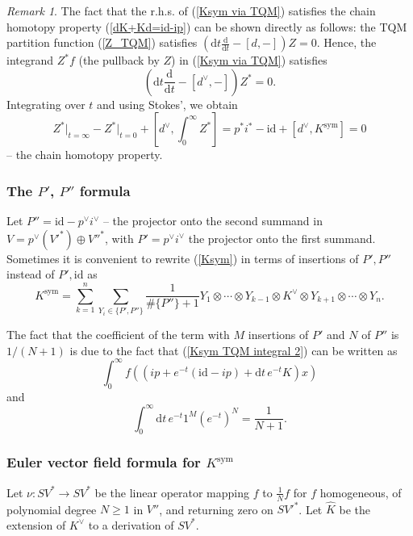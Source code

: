 \documentclass{amsart}
\theoremstyle{plain} %
\theoremstyle{definition}
\theoremstyle{remark}
\newtheorem{rem}[thm]{Remark}
\newcommand{\mr}{\mathrm}
\newcommand{\ra}{\rightarrow}
\newcommand{\wh}{\widehat}
\newcommand{\ddd}{\mathrm{d}}
\newcommand{\dr}{\mathrm{d}}
\begin{document}
\begin{rem}
The fact that the r.h.s. of (\ref{Ksym via TQM}) satisfies the chain homotopy property (\ref{dK+Kd=id-ip}) can be shown directly as follows: the TQM partition function (\ref{Z_TQM}) satisfies $(\dr t \frac{\ddd}{\ddd t}-[d,-])Z=0$. Hence, the integrand $Z^*f$ (the pullback by $Z$) in (\ref{Ksym via TQM}) satisfies
\begin{equation}
    (\dr t \frac{\ddd}{\ddd t}-[d^\vee,-])Z^*=0.
\end{equation}
Integrating over $t$ and using Stokes', we obtain
\begin{equation}
    Z^*\big|_{t=\infty}-Z^*\big|_{t=0}+\left[d^\vee,\int_0^\infty Z^*\right]= p^*i^*-\mr{id}+[d^\vee, K^\mr{sym}]=0
\end{equation}
-- the chain homotopy property.
\end{rem}


\subsubsection{The \texorpdfstring{$P'$, $P''$}{P',P''} formula}
Let $P''=\mr{id}-p^\vee i^\vee$ -- the projector onto the second summand in $V=p^\vee(V'^*)\oplus V''^*$, with $P'=p^\vee i^\vee$ the projector onto the first summand.
Sometimes it is convenient to rewrite (\ref{Ksym}) in terms of insertions of $P',P''$ instead of $P',\mr{id}$ as
\begin{equation}\label{Ksym P',P'' formula}
    K^\mr{sym}=\sum_{k=1}^n \sum_{Y_i\in \{P',P''\}} \frac{1}{\#\{P''\}+1} Y_1\otimes\cdots \otimes Y_{k-1}\otimes K^\vee \otimes Y_{k+1}\otimes \cdots \otimes Y_n.
\end{equation}

The fact that the coefficient of the term with $M$ insertions of $P'$ and $N$ of $P''$ is $1/(N+1)$ is due to the fact that (\ref{Ksym TQM integral 2}) can be written as
\begin{equation}
    \int_0^\infty f((ip+e^{-t}(\mr{id}-ip)+\dr t\, e^{-t}K)x)
\end{equation}
and 
\begin{equation}
    \int_0^\infty \dr t\, e^{-t} 1^M (e^{-t})^N=\frac{1}{N+1}.
\end{equation}

\subsubsection{%
Euler vector field
formula for \texorpdfstring{$K^\mr{sym}$}{Ksym}}\label{sss: Ksym=nu whK}
Let $\nu\colon S V^*\ra SV^*$ be the linear operator mapping $f$ to $\frac{1}{N} f$ for $f$ homogeneous, of polynomial degree $N\geq 1$ in $V''$, and returning zero on $S %
V'^*$. Let $\wh{K}$ be the extension of $K^\vee$ to a derivation of $SV^*$.
\end{document}
